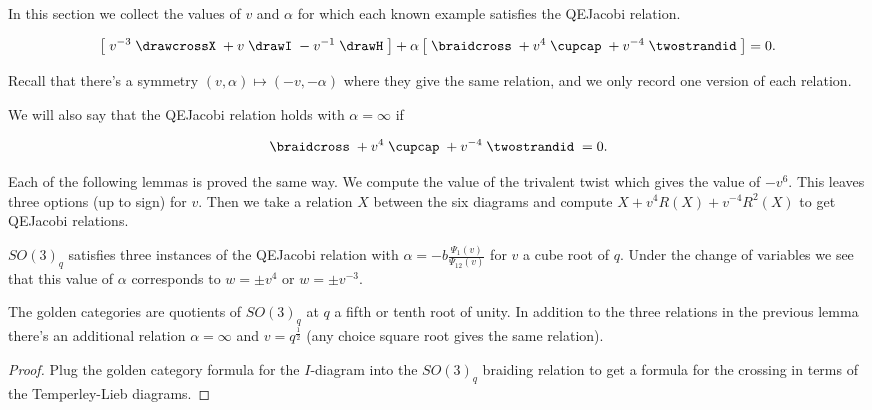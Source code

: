 \documentclass[12pt]{amsart}
\begin{document}
In this section we collect the values of $v$ and $\alpha$ for which each known example satisfies the QEJacobi relation.  

\begin{equation*}
\left[\; v^{-3} \;
\drawcrossX
\;+ v \;
\drawI
\; -v^{-1} \;
 \drawH
\;\right]
 + \alpha
\left[\; \braidcross \;
 + v^{4}\;
\cupcap
\; + v^{-4} \;
 \twostrandid \;
 \right] = 0.
 \end{equation*}
 
Recall that there's a symmetry $(v,\alpha) \mapsto (-v,-\alpha)$ where they give the same relation, and we only record one version of each relation.

We will also say that the QEJacobi relation holds with $\alpha=\infty$ if

\begin{equation*}
\braidcross \;
 + v^{4}\;
\cupcap
\; + v^{-4} \;
 \twostrandid \;= 0.
 \end{equation*}

Each of the following lemmas is proved the same way.  We compute the value of the trivalent twist which gives the value of $-v^6$.  This leaves three options (up to sign) for $v$.  Then we take a relation $X$ between the six diagrams and compute $X+v^{4} R(X)+ v^{-4}R^2(X)$ to get QEJacobi relations. 

\begin{lemma}
$SO(3)_q$ satisfies three instances of the QEJacobi relation with $\alpha = -b \frac{\Psi_1(v)}{\Psi_{12}(v)} $ for $v$ a cube root of $q$.  Under the change of variables we see that this value of $\alpha$ corresponds to $w = \pm v^4$ or $w = \pm v^{-3}$.
\end{lemma}

\begin{lemma}
The golden categories are quotients of $SO(3)_q$ at $q$ a fifth or tenth root of unity.  In addition to the three relations in the previous lemma there's an additional relation $\alpha=\infty$ and $v = q^{\frac{1}{2}}$ (any choice square root gives the same relation).
 \end{lemma}
 \begin{proof}
Plug the golden category formula for the $I$-diagram into the $SO(3)_q$ braiding relation to get a formula for the crossing in terms of the Temperley-Lieb diagrams.
 \end{proof}
\end{document}
